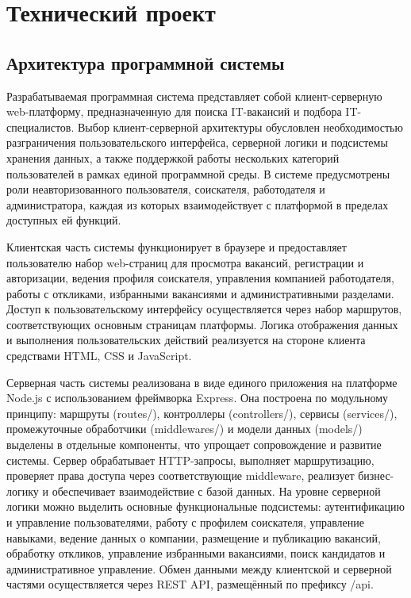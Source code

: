 \section{Технический проект}
\subsection{Архитектура программной системы}

Разрабатываемая программная система представляет собой клиент-серверную web-платформу, предназначенную для поиска IT-вакансий и подбора IT-специалистов. Выбор клиент-серверной архитектуры обусловлен необходимостью разграничения пользовательского интерфейса, серверной логики и подсистемы хранения данных, а также поддержкой работы нескольких категорий пользователей в рамках единой программной среды. В системе предусмотрены роли неавторизованного пользователя, соискателя, работодателя и администратора, каждая из которых взаимодействует с платформой в пределах доступных ей функций.

Клиентская часть системы функционирует в браузере и предоставляет пользователю набор web-страниц для просмотра вакансий, регистрации и авторизации, ведения профиля соискателя, управления компанией работодателя, работы с откликами, избранными вакансиями и административными разделами. Доступ к пользовательскому интерфейсу осуществляется через набор маршрутов, соответствующих основным страницам платформы. Логика отображения данных и выполнения пользовательских действий реализуется на стороне клиента средствами HTML, CSS и JavaScript.

Серверная часть системы реализована в виде единого приложения на платформе Node.js с использованием фреймворка Express. Она построена по модульному принципу: маршруты (routes/), контроллеры (controllers/), сервисы (services/), промежуточные обработчики (middlewares/) и модели данных (models/) выделены в отдельные компоненты, что упрощает сопровождение и развитие системы. Сервер обрабатывает HTTP-запросы, выполняет маршрутизацию, проверяет права доступа через соответствующие middleware, реализует бизнес-логику и обеспечивает взаимодействие с базой данных. На уровне серверной логики можно выделить основные функциональные подсистемы: аутентификацию и управление пользователями, работу с профилем соискателя, управление навыками, ведение данных о компании, размещение и публикацию вакансий, обработку откликов, управление избранными вакансиями, поиск кандидатов и административное управление. Обмен данными между клиентской и серверной частями осуществляется через REST API, размещённый по префиксу /api.

